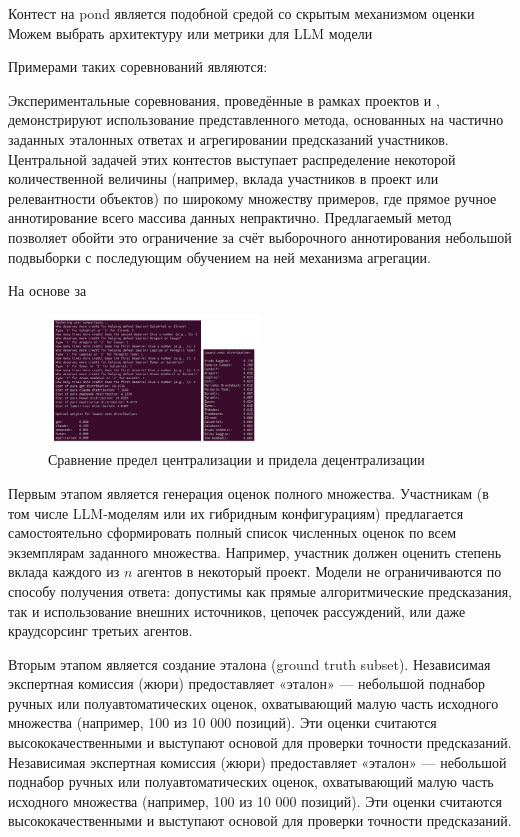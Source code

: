 \documentclass[
    14pt,
    specialist,
    candidate, %
    subf, %
    href,
    dotsinheaders=false
]{disser}
\begin{document}
Контест на pond является подобной средой со скрытым механизмом оценки
Можем выбрать архитектуру или метрики для LLM модели

Примерами таких соревнований являются:

Экспериментальные соревнования, проведённые в рамках проектов \cite{cryptopond2025gg23} и \cite{cryptopond2025quantifying}, демонстрируют использование представленного метода, основанных на частично заданных эталонных ответах и агрегировании предсказаний участников. Центральной задачей этих контестов выступает распределение некоторой количественной величины (например, вклада участников в проект или релевантности объектов) по широкому множеству примеров, где прямое ручное аннотирование всего массива данных непрактично. Предлагаемый метод позволяет обойти это ограничение за счёт выборочного аннотирования небольшой подвыборки с последующим обучением на ней механизма агрегации.

На основе за \cite{lange2024angels}

\begin{figure}[H]
  \centering
  \includegraphics[width=0.5\textwidth]{./assets/llmcontest.png}
  \caption{Сравнение предел централизации и придела децентрализации}
  \label{fig:llmcontest}
\end{figure}

Первым этапом является генерация оценок полного множества. Участникам (в том числе LLM-моделям или их гибридным конфигурациям) предлагается самостоятельно сформировать полный список численных оценок по всем экземплярам заданного множества. Например, участник должен оценить степень вклада каждого из $n$ агентов в некоторый проект. Модели не ограничиваются по способу получения ответа: допустимы как прямые алгоритмические предсказания, так и использование внешних источников, цепочек рассуждений, или даже краудсорсинг третьих агентов.

Вторым этапом является создание эталона (ground truth subset). Независимая экспертная комиссия (жюри) предоставляет «эталон» --- небольшой поднабор ручных или полуавтоматических оценок, охватывающий малую часть исходного множества (например, 100 из 10 000 позиций). Эти оценки считаются высококачественными и выступают основой для проверки точности предсказаний. Независимая экспертная комиссия (жюри) предоставляет «эталон» --- небольшой поднабор ручных или полуавтоматических оценок, охватывающий малую часть исходного множества (например, 100 из 10 000 позиций). Эти оценки считаются высококачественными и выступают основой для проверки точности предсказаний.
\end{document}
